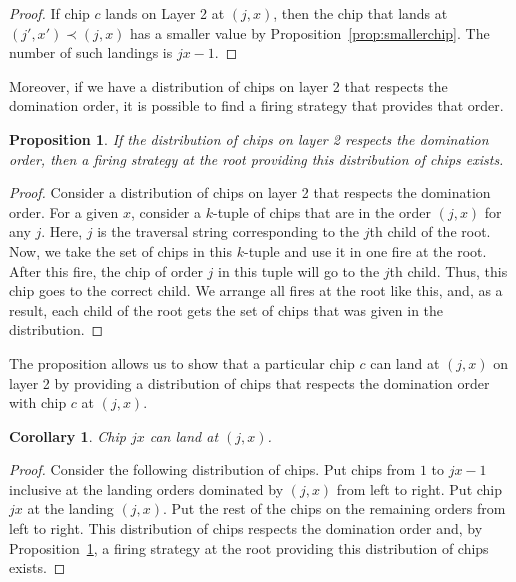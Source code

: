 \documentclass[11pt]{article}
\newtheorem{corollary}{Corollary}[theorem] %
\newtheorem{proposition}[theorem]{Proposition}
\theoremstyle{definition}
\theoremstyle{remark}
\begin{document}
\begin{proof}
    If chip $c$ lands on Layer 2 at $(j, x)$, then the chip that lands at $(j',x') \prec (j,x)$ has a smaller value by Proposition~\ref{prop:smallerchip}. The number of such landings is $jx-1$.
\end{proof}

Moreover, if we have a distribution of chips on layer 2 that respects the domination order, it is possible to find a firing strategy that provides that order.

\begin{proposition}\label{prop:LandingOrderLayer2}
    If the distribution of chips on layer 2 respects the domination order, then a firing strategy at the root providing this distribution of chips exists.
\end{proposition}

\begin{proof}
    Consider a distribution of chips on layer 2 that respects the domination order. For a given $x$, consider a $k$-tuple of chips that are in the order $(j,x)$ for any $j$. Here, $j$ is the traversal string corresponding to the $j$th child of the root. Now, we take the set of chips in this $k$-tuple and use it in one fire at the root. After this fire, the chip of order $j$ in this tuple will go to the $j$th child. Thus, this chip goes to the correct child. We arrange all fires at the root like this, and, as a result, each child of the root gets the set of chips that was given in the distribution.
\end{proof}

The proposition allows us to show that a particular chip $c$ can land at $(j,x)$ on layer 2 by providing a distribution of chips that respects the domination order with chip $c$ at $(j,x)$.

\begin{corollary}
\label{cor:smallestexist}
    Chip $jx$ can land at $(j,x)$.
\end{corollary}

\begin{proof}
    Consider the following distribution of chips. Put chips from $1$ to $jx-1$ inclusive at the landing orders dominated by $(j,x)$ from left to right. Put chip $jx$ at the landing $(j,x)$. Put the rest of the chips on the remaining orders from left to right. This distribution of chips respects the domination order and, by Proposition~\ref{prop:LandingOrderLayer2}, a firing strategy at the root providing this distribution of chips exists.
\end{proof}
\end{document}
